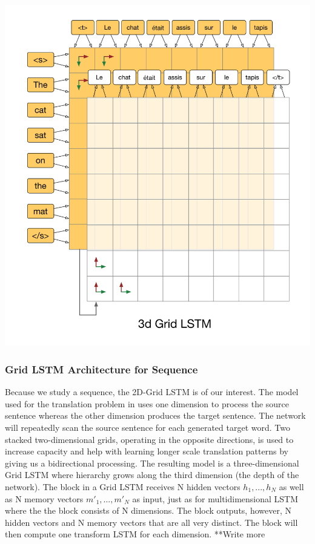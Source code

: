 \documentclass{article} %
\begin{document}
\includegraphics[scale=0.5]{3dgridlstm} \newline
\subsubsection{Grid LSTM Architecture for Sequence}
 Because we study a sequence, the 2D-Grid LSTM is of our interest. The model used for the translation problem in \cite{Kalchbrenner} uses one dimension to process the source sentence whereas the other dimension produces the target sentence. The network will repeatedly scan the source sentence for each generated target word. Two stacked two-dimensional grids, operating in the opposite directions, is used to increase capacity and help with learning longer scale translation patterns by giving us a bidirectional processing. The resulting model is a three-dimensional Grid LSTM where hierarchy grows along the third dimension (the depth of the network). The block in a Grid LSTM receives N hidden vectors $h_1, ..., h_N$ as well as N memory vectors $m'_1, ..., m'_N$ as input, just as for multidimensional LSTM where the the block consists of N dimensions. The block outputs, however, N hidden vectors and N memory vectors that are all very distinct. The block will then compute one transform LSTM for each dimension. **Write more
\end{document}
